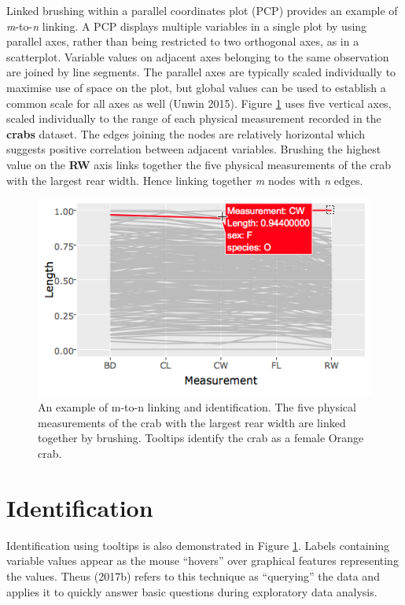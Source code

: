\documentclass[]{book}
\theoremstyle{definition}
\theoremstyle{definition}
\theoremstyle{definition}
\theoremstyle{remark}
\begin{document}
Linked brushing within a parallel coordinates plot (PCP) provides an
example of \emph{m}-to-\emph{n} linking. A PCP displays multiple
variables in a single plot by using parallel axes, rather than being
restricted to two orthogonal axes, as in a scatterplot. Variable values
on adjacent axes belonging to the same observation are joined by line
segments. The parallel axes are typically scaled individually to
maximise use of space on the plot, but global values can be used to
establish a common scale for all axes as well (Unwin 2015). Figure
\ref{fig:m2nuni} uses five vertical axes, scaled individually to the
range of each physical measurement recorded in the \textbf{crabs}
dataset. The edges joining the nodes are relatively horizontal which
suggests positive correlation between adjacent variables. Brushing the
highest value on the \textbf{RW} axis links together the five physical
measurements of the crab with the largest rear width. Hence linking
together \emph{m} nodes with \emph{n} edges.

\begin{figure}[htbp]
\centering
\includegraphics{files/m2n_uni.jpg}
\caption{\label{fig:m2nuni}An example of m-to-n linking and identification.
The five physical measurements of the crab with the largest rear width
are linked together by brushing. Tooltips identify the crab as a female
Orange crab.}
\end{figure}

\section{Identification}\label{identification}

Identification using tooltips is also demonstrated in Figure
\ref{fig:m2nuni}. Labels containing variable values appear as the mouse
``hovers'' over graphical features representing the values. Theus
(2017b) refers to this technique as ``querying'' the data and applies it
to quickly answer basic questions during exploratory data analysis.
\end{document}
